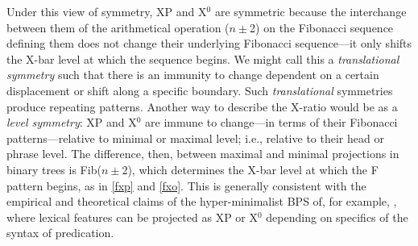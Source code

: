 \documentclass[11pt,twoside]{article}
\theoremstyle{plain}
\numberwithin{equation}{section}
\theoremstyle{definition}
\newtheorem{phrase string}{Phrase String}
\begin{document}
	
Under this view of symmetry, XP and X$^{0}$ are symmetric because the interchange between them of the arithmetical operation ($n\pm$2) on the Fibonacci sequence defining them does not change their underlying Fibonacci sequence---it only shifts the X-bar level at which the sequence begins. We might call this a \textsl{translational symmetry} such that there is an immunity to change dependent on a certain displacement or shift along a specific boundary. Such \textsl{translational} symmetries produce repeating patterns. Another way to describe the X-ratio would be as a \textsl{level symmetry}: XP and X$^{0}$ are immune to change---in terms of their Fibonacci patterns---relative to minimal or maximal level; i.e., relative to their head or phrase level. The difference, then, between maximal and minimal projections in binary trees is Fib($n\pm$2), which determines the X-bar level at which the F pattern begins, as in \ref{fxp} and \ref{fxo}. This is generally consistent with the empirical and theoretical claims of the hyper-minimalist BPS of, for example, \cite{carnie:2000}, where lexical features can be projected as XP or X$^{0}$ depending on specifics of the syntax of predication. 
\end{document}
